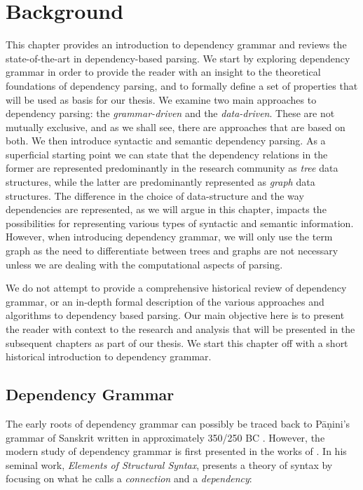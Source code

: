\chapter{Background}
\label{chap:background}

This chapter provides an introduction to dependency grammar and reviews the state-of-the-art in dependency-based parsing. We start by exploring dependency grammar in order to provide the reader with an insight to the theoretical foundations of dependency parsing, and to formally define a set of properties that will be used as basis for our thesis. We examine two main approaches to dependency parsing: the \textit{grammar-driven} and the \textit{data-driven}. These are not mutually exclusive, and as we shall see, there are approaches that are based on both. We then introduce syntactic and semantic dependency parsing. As a superficial starting point we can state that the dependency relations in the former are represented predominantly in the research community as \textit{tree} data structures, while the latter are predominantly represented as \textit{graph} data structures. The difference in the choice of data-structure and the way dependencies are represented, as we will argue in this chapter, impacts the possibilities for representing various types of syntactic and semantic information. However, when introducing dependency grammar, we will only use the term graph as the need to differentiate between trees and graphs are not necessary unless we are dealing with the computational aspects of parsing.

We do not attempt to provide a comprehensive historical review of dependency grammar, or an in-depth formal description of the various approaches and algorithms to dependency based parsing. Our main objective here is to present the reader with context to the research and analysis that will be presented in the subsequent chapters as part of our thesis. We start this chapter off with a short historical introduction to dependency grammar.

\section{Dependency Grammar}
The early roots of dependency grammar can possibly be traced back to P\={a}\d{n}ini's grammar of Sanskrit written in approximately 350/250 BC \cite{Kruijff:02}. However, the modern study of  dependency grammar is first presented in the works of \citeauthor{Tes:15}. In his seminal work, \textit{Elements of Structural Syntax}, \citeauthor{Tes:15} presents a theory of syntax by focusing on what he calls a \textit{connection} and a \textit{dependency}:

